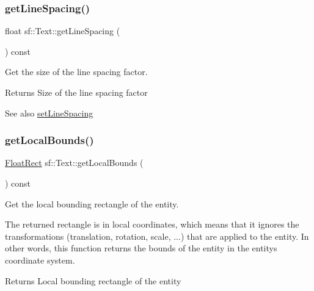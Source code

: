 \subsubsection{\texorpdfstring{getLineSpacing()}{getLineSpacing()}}
{\footnotesize\ttfamily float sf\+::\+Text\+::get\+Line\+Spacing (\begin{DoxyParamCaption}{ }\end{DoxyParamCaption}) const}



Get the size of the line spacing factor. 

\begin{DoxyReturn}{Returns}
Size of the line spacing factor
\end{DoxyReturn}
\begin{DoxySeeAlso}{See also}
\mbox{\hyperlink{classsf_1_1_text_af6505688f79e2e2d90bd68f4d767e965}{set\+Line\+Spacing}} \begin{DoxyVerb}\end{DoxyVerb}
 
\end{DoxySeeAlso}
\mbox{\label{classsf_1_1_text_a3e6b3b298827f853b41165eee2cbbc66}} 
\subsubsection{\texorpdfstring{getLocalBounds()}{getLocalBounds()}}
{\footnotesize\ttfamily \mbox{\hyperlink{classsf_1_1_rect}{Float\+Rect}} sf\+::\+Text\+::get\+Local\+Bounds (\begin{DoxyParamCaption}{ }\end{DoxyParamCaption}) const}



Get the local bounding rectangle of the entity. 

The returned rectangle is in local coordinates, which means that it ignores the transformations (translation, rotation, scale, ...) that are applied to the entity. In other words, this function returns the bounds of the entity in the entity\textquotesingle{}s coordinate system.

\begin{DoxyReturn}{Returns}
Local bounding rectangle of the entity \begin{DoxyVerb}\end{DoxyVerb}
 
\end{DoxyReturn}
\mbox{\label{classsf_1_1_text_a53559d563461089f1172571b375442dc}} 
